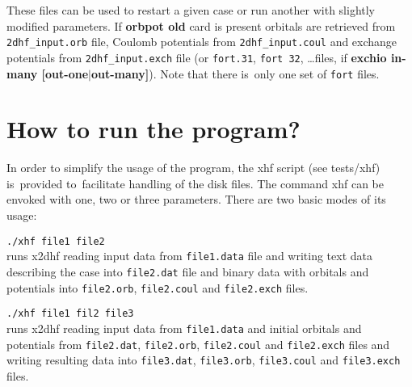 \documentclass[12pt,a4paper]{article}
\begin{document}
These files can be used to restart a given case or run another with slightly modified
parameters. If \textbf{orbpot old} card is present orbitals are retrieved from
\texttt{2dhf\-\_in\-put\-.orb} file, Coulomb potentials from \texttt{2dhf\_input.coul} and
exchange potentials from \texttt{2dhf\_input.exch} file (or \texttt{fort.31}, \texttt{fort
  32}, \ldots files, if \textbf{exchio in-many [out-one$|$out-many]}). Note that there
is~only one set of \texttt{fort} files.

\bigskip

\section{How to run the program?} 

\noindent
In order to simplify the usage of the program, the xhf script (see tests/xhf) is~provided
to~facilitate handling of the disk files.  The command xhf can be envoked with one, two or
three parameters. There are two basic modes of its usage:



\begin{description} 
\item \hspace*{0.5cm} \texttt{./xhf file1 file2}\\ runs x2dhf reading
  input data from \texttt{file1.data} file and writing text data
  describing the case into \texttt{file2.dat} file and binary data
  with orbitals and potentials into \texttt{file2.orb},
  \texttt{file2.coul} and \texttt{file2.exch} files.
\end{description} 


\begin{description} 
\item \hspace*{0.5cm} \texttt{./xhf file1 fil2 file3}\\ runs x2dhf
  reading input data from \texttt{file1.data} and initial orbitals and
  potentials from \texttt{file2.dat}, \texttt{file2.orb},
  \texttt{file2.coul} and \texttt{file2.exch} files and writing
  resulting data into \texttt{file3.dat}, \texttt{file3.orb},
  \texttt{file3.coul} and \texttt{file3.exch} files.
\end{description} 
\end{document}
